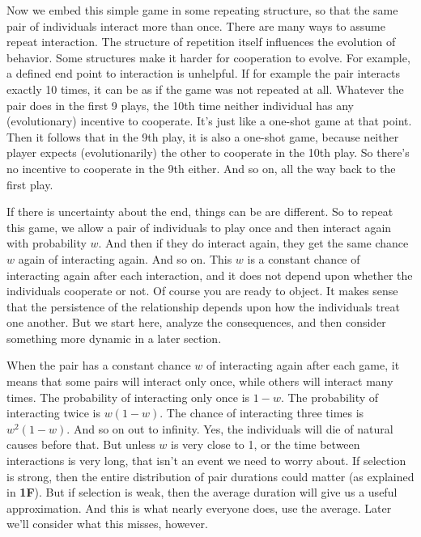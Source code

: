 \documentclass[10pt,reqno]{amsbook}
\newcommand{\bemph}[1]{{\textbf{\textcolor{bemphcol}{#1}}}}
\numberwithin{equation}{chapter}
\begin{document}
Now we embed this simple game in some repeating structure, so that the same pair of individuals interact more than once. There are many ways to assume repeat interaction. The structure of repetition itself influences the evolution of behavior. Some structures make it harder for cooperation to evolve. For example, a defined end point to interaction is unhelpful. If for example the pair interacts exactly 10 times, it can be as if the game was not repeated at all. Whatever the pair does in the first 9 plays, the 10th time neither individual has any (evolutionary) incentive to cooperate. It's just like a one-shot game at that point. Then it follows that in the 9th play, it is also a one-shot game, because neither player expects (evolutionarily) the other to cooperate in the 10th play. So there's no incentive to cooperate in the 9th either. And so on, all the way back to the first play.

If there is uncertainty about the end, things can be are different. So to repeat this game, we allow a pair of individuals to play once and then interact again with probability $w$. And then if they do interact again, they get the same chance $w$ again of interacting again. And so on. This $w$ is a constant chance of interacting again after each interaction, and it does not depend upon whether the individuals cooperate or not. Of course you are ready to object. It makes sense that the persistence of the relationship depends upon how the individuals treat one another. But we start here, analyze the consequences, and then consider something more dynamic in a later section.

When the pair has a constant chance $w$ of interacting again after each game, it means that some pairs will interact only once, while others will interact many times. The probability of interacting only once is $1-w$. The probability of interacting twice is $w(1-w)$. The chance of interacting three times is $w^2(1-w)$. And so on out to infinity. Yes, the individuals will die of natural causes before that. But unless $w$ is very close to 1, or the time between interactions is very long, that isn't an event we need to worry about. If selection is strong, then the entire distribution of pair durations could matter (as explained in \bemph{1F}). But if selection is weak, then the average duration will give us a useful approximation. And this is what nearly everyone does, use the average. Later we'll consider what this misses, however.
\end{document}

